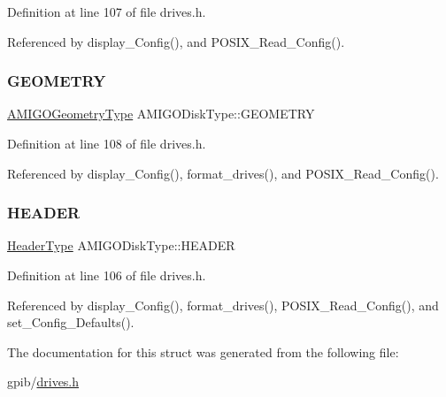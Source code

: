 Definition at line 107 of file drives.\+h.



Referenced by display\+\_\+\+Config(), and P\+O\+S\+I\+X\+\_\+\+Read\+\_\+\+Config().

\mbox{\label{structAMIGODiskType_ade07402a60cc0e5824ca61f6a4ea88d9}} 
\subsubsection{\texorpdfstring{G\+E\+O\+M\+E\+T\+RY}{GEOMETRY}}
{\footnotesize\ttfamily \hyperlink{structAMIGOGeometryType}{A\+M\+I\+G\+O\+Geometry\+Type} A\+M\+I\+G\+O\+Disk\+Type\+::\+G\+E\+O\+M\+E\+T\+RY}



Definition at line 108 of file drives.\+h.



Referenced by display\+\_\+\+Config(), format\+\_\+drives(), and P\+O\+S\+I\+X\+\_\+\+Read\+\_\+\+Config().

\mbox{\label{structAMIGODiskType_a9814efe6f564b104fc7e0100231908a8}} 
\subsubsection{\texorpdfstring{H\+E\+A\+D\+ER}{HEADER}}
{\footnotesize\ttfamily \hyperlink{structHeaderType}{Header\+Type} A\+M\+I\+G\+O\+Disk\+Type\+::\+H\+E\+A\+D\+ER}



Definition at line 106 of file drives.\+h.



Referenced by display\+\_\+\+Config(), format\+\_\+drives(), P\+O\+S\+I\+X\+\_\+\+Read\+\_\+\+Config(), and set\+\_\+\+Config\+\_\+\+Defaults().



The documentation for this struct was generated from the following file\+:\begin{DoxyCompactItemize}
\item 
gpib/\hyperlink{drives_8h}{drives.\+h}\end{DoxyCompactItemize}
